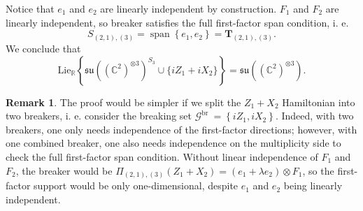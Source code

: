 \documentclass[11pt,letterpaper]{article}
\theoremstyle{plain}
\theoremstyle{plain}
\theoremstyle{plain}
\theoremstyle{plain}
\theoremstyle{plain}
\theoremstyle{plain}
\newcommand{\R}{\mathbb{R}}
\newcommand{\Lie}{\mathrm{Lie}}
\theoremstyle{plain}
\theoremstyle{definition}
\newtheorem{smremark}[smtheorem]{Remark}
\theoremstyle{plain}
\begin{document}
Notice that $e_1$ and $e_2$ are linearly independent by construction. $F_1$ and $F_2$ are linearly independent, so breaker satisfies the full first-factor span condition, i. e.
\[
    S_{(2,1),(3)}=\operatorname{span}\left\{e_1, e_2\right\}=\mathbf{T}_{(2,1),(3)}.
\]
We conclude that
\[
    \Lie_{\R}\left\{\mathfrak{su}\left((\mathbb{C}^2)^{\otimes 3}\right)^{S_3} \cup\{iZ_1+iX_2\}\right\}=\mathfrak{su}\left((\mathbb{C}^2)^{\otimes 3}\right).
\]

\begin{smremark}
    The proof would be simpler if we split the $Z_1+X_2$ Hamiltonian into two breakers, i. e. consider the breaking set $\mathcal{G}^{\text {br }}=\left\{i Z_1, i X_2\right\}$. 
    Indeed, with two breakers, one only needs independence of the first-factor directions; however, with one combined breaker, one also needs independence on the multiplicity side to check the full first-factor span condition.
    Without linear independence of $F_1$ and $F_2$, the breaker would be $\Pi_{(2,1),(3)}(Z_1+X_2)=(e_1+ \lambda e_2) \otimes F_1$,
    so the first-factor support would be only one-dimensional, despite $e_1$ and $e_2$ being linearly independent.
\end{smremark}





\end{document}
